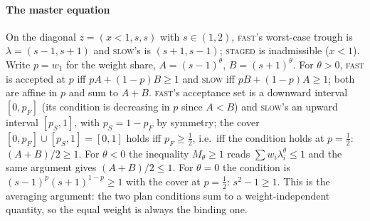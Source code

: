 \documentclass[preprint,11pt,authoryear]{elsarticle}
\theoremstyle{remark}
\newcommand{\act}[1]{\textsc{#1}}
\begin{document}
\paragraph{The master equation} On the diagonal $z=(x<1,s,s)$ with $s\in(1,2)$, \act{fast}'s worst-case trough is $\lambda=(s-1,s+1)$ and \act{slow}'s is $(s+1,s-1)$; \act{staged} is inadmissible ($x<1$). Write $p=w_1$ for the weight share, $A=(s-1)^\theta$, $B=(s+1)^\theta$. For $\theta>0$, \act{fast} is accepted at $p$ iff $pA+(1-p)B\ge1$ and \act{slow} iff $pB+(1-p)A\ge1$; both are affine in $p$ and sum to $A+B$. \act{fast}'s acceptance set is a downward interval $[0,p_F]$ (its condition is decreasing in $p$ since $A<B$) and \act{slow}'s an upward interval $[p_S,1]$, with $p_S=1-p_F$ by symmetry; the cover $[0,p_F]\cup[p_S,1]=[0,1]$ holds iff $p_F\ge\tfrac12$, i.e.\ iff the condition holds at $p=\tfrac12$: $(A+B)/2\ge1$. For $\theta<0$ the inequality $M_\theta\ge1$ reads $\sum w_i\lambda_i^\theta\le1$ and the same argument gives $(A+B)/2\le1$. For $\theta=0$ the condition is $(s-1)^p(s+1)^{1-p}\ge1$ with the cover at $p=\tfrac12$: $s^2-1\ge1$. This is the averaging argument: the two plan conditions sum to a weight-independent quantity, so the equal weight is always the binding one.
\end{document}
